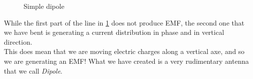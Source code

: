 \begin{figure}[H]
    \begin{center}
    \end{center} \caption{Simple dipole}\label{fig:TL_dipole2} 
\end{figure}
While the first part of the line in \cref{fig:TL_dipole2} does not produce EMF, the second one that we have bent is generating a current distribution in phase and in vertical direction.\\
This does mean that we are moving electric charges along a vertical axe, and so we are generating an EMF! What we have created is a very rudimentary antenna that we call \emph{Dipole}.

